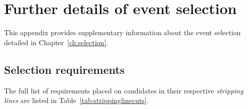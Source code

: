 \chapter{Further details of event selection}
\label{ch:appendix_selection}


This appendix provides supplementary information about the event selection detailed in Chapter~\ref{ch:selection}.


\section{Selection requirements}
\label{sec:app_sel_strip}

The full list of requirements placed on candidates in their respective \emph{stripping lines} are listed in Table~\ref{tab:strippinglinecuts}.

